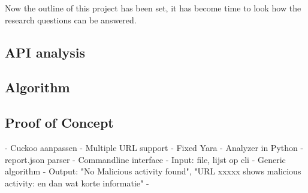 

Now the outline of this project has been set, it has become time to look how the research questions can be answered. 

\subsection{API analysis}

\subsection{Algorithm}

\subsection{Proof of Concept}
	- Cuckoo aanpassen
		- Multiple URL support
		- Fixed Yara
	- Analyzer in Python
		- report.json parser
		- Commandline interface
			- Input: file, lijst op cli
			- Generic algorithm
			- Output: "No Malicious activity found", "URL xxxxx shows malicious activity: en dan wat korte informatie" 
		- 